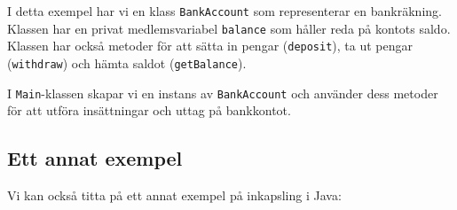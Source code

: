 \begin{Shaded}
\begin{Highlighting}[]
\OperatorTok{=}  \OperatorTok{(}\OperatorTok{);}
\OperatorTok{(} \OperatorTok{+}\OperatorTok{());}
\OperatorTok{(}\OperatorTok{);}
\OperatorTok{(} \OperatorTok{+}\OperatorTok{());}
\OperatorTok{(}\OperatorTok{);}
\OperatorTok{(} \OperatorTok{+}\OperatorTok{());}
\OperatorTok{\}}
\OperatorTok{\}}
\end{Highlighting}
\end{Shaded}

I detta exempel har vi en klass \texttt{BankAccount} som representerar
en bankräkning. Klassen har en privat medlemsvariabel \texttt{balance}
som håller reda på kontots saldo. Klassen har också metoder för att
sätta in pengar (\texttt{deposit}), ta ut pengar (\texttt{withdraw}) och
hämta saldot (\texttt{getBalance}).

I \texttt{Main}-klassen skapar vi en instans av \texttt{BankAccount} och
använder dess metoder för att utföra insättningar och uttag på
bankkontot.

\hypertarget{ett-annat-exempel}{%
\subsection{Ett annat exempel}\label{ett-annat-exempel}}

Vi kan också titta på ett annat exempel på inkapsling i Java:

